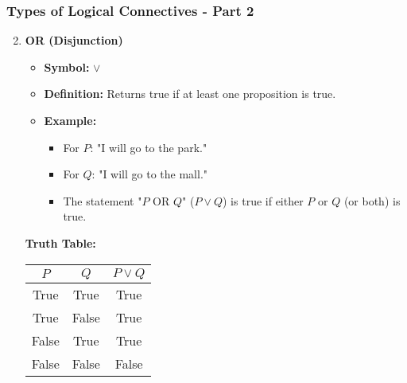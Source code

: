 \documentclass[aspectratio=169]{beamer}
\begin{document}
\begin{frame}[fragile]
    \frametitle{Types of Logical Connectives - Part 2}
    \begin{enumerate}
        \setcounter{enumi}{1} %
        \item \textbf{OR (Disjunction)} 
            \begin{itemize}
                \item \textbf{Symbol:} $\vee$
                \item \textbf{Definition:} Returns true if at least one proposition is true.
                \item \textbf{Example:}
                \begin{itemize}
                    \item For $P$: "I will go to the park."
                    \item For $Q$: "I will go to the mall."
                    \item The statement "$P$ OR $Q$" ($P \vee Q$) is true if either $P$ or $Q$ (or both) is true.
                \end{itemize}
            \end{itemize}
            \textbf{Truth Table:}
            \begin{tabular}{|c|c|c|}
                \hline
                $P$ & $Q$ & $P \vee Q$ \\
                \hline
                True & True  & True  \\
                True & False & True  \\
                False & True  & True  \\
                False & False & False \\
                \hline
            \end{tabular}
    \end{enumerate}
\end{frame}
\end{document}
